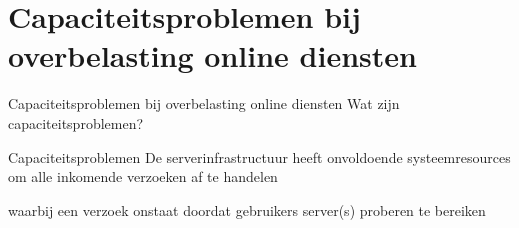 \documentclass{beamer}
\begin{document}
\section[Capaciteitsproblemen]{Capaciteitsproblemen bij overbelasting online diensten}
% 
% 
% 
% 
% 
\begin{frame}{Capaciteitsproblemen bij overbelasting online diensten}
    Wat zijn capaciteitsproblemen?
    \begin{alertblock}{Capaciteitsproblemen}
        De serverinfrastructuur heeft onvoldoende systeemresources
        om alle inkomende verzoeken af te handelen
    \end{alertblock}
    waarbij een verzoek onstaat doordat gebruikers server(s) proberen te bereiken
\end{frame}
\end{document}
